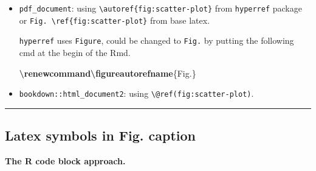 \documentclass[
  a4paper,
  twoside,
  openright]{book}
\newenvironment{Shaded}{\begin{snugshade}}{\end{snugshade}}
\newcommand{\FunctionTok}[1]{\textcolor[rgb]{0.13,0.29,0.53}{\textbf{#1}}}
\newcommand{\NormalTok}[1]{#1}
\theoremstyle{definition}
\theoremstyle{definition}
\theoremstyle{definition}
\theoremstyle{definition}
\theoremstyle{remark}
\begin{document}
\begin{enumerate}
  \begin{itemize}
  \item
    \texttt{pdf\_document}: using \texttt{\textbackslash{}autoref\{fig:scatter-plot\}} from \texttt{hyperref} package or \texttt{Fig.\ \textbackslash{}ref\{fig:scatter-plot\}} from base latex.

    \texttt{hyperref} uses \texttt{Figure}, could be changed to \texttt{Fig.} by putting the following cmd at the begin of the Rmd.

\begin{Shaded}
\begin{Highlighting}[]
\FunctionTok{\textbackslash{}renewcommand\textbackslash{}figureautorefname}\NormalTok{\{Fig.\}}
\end{Highlighting}
\end{Shaded}
  \item
    \texttt{bookdown::html\_document2}: using \texttt{\textbackslash{}@ref(fig:scatter-plot)}.
  \end{itemize}
\end{enumerate}

\begin{center}\rule{0.5\linewidth}{0.5pt}\end{center}

\subsection*{Latex symbols in Fig. caption}\label{latex-symbols-in-fig.-caption}

\textbf{The R code block approach.}
\end{document}
